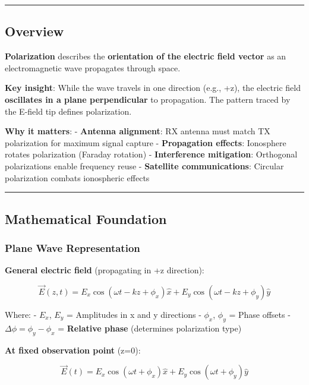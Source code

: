 \begin{center}\rule{0.5\linewidth}{0.5pt}\end{center}

\subsection{Overview}\label{overview}

\textbf{Polarization} describes the \textbf{orientation of the electric
field vector} as an electromagnetic wave propagates through space.

\textbf{Key insight}: While the wave travels in one direction (e.g.,
+z), the electric field \textbf{oscillates in a plane perpendicular} to
propagation. The pattern traced by the E-field tip defines polarization.

\textbf{Why it matters}: - \textbf{Antenna alignment}: RX antenna must
match TX polarization for maximum signal capture - \textbf{Propagation
effects}: Ionosphere rotates polarization (Faraday rotation) -
\textbf{Interference mitigation}: Orthogonal polarizations enable
frequency reuse - \textbf{Satellite communications}: Circular
polarization combats ionospheric effects

\begin{center}\rule{0.5\linewidth}{0.5pt}\end{center}

\subsection{Mathematical Foundation}\label{mathematical-foundation}

\subsubsection{Plane Wave
Representation}\label{plane-wave-representation}

\textbf{General electric field} (propagating in +z direction):

\[
\vec{E}(z,t) = E_x \cos(\omega t - kz + \phi_x)\hat{x} + E_y \cos(\omega t - kz + \phi_y)\hat{y}
\]

Where: - \(E_x\), \(E_y\) = Amplitudes in x and y directions -
\(\phi_x\), \(\phi_y\) = Phase offsets -
\(\Delta\phi = \phi_y - \phi_x\) = \textbf{Relative phase} (determines
polarization type)

\textbf{At fixed observation point} (z=0):

\[
\vec{E}(t) = E_x \cos(\omega t + \phi_x)\hat{x} + E_y \cos(\omega t + \phi_y)\hat{y}
\]

